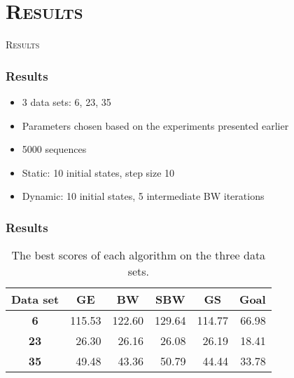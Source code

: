 \section{\scshape Results}

\begin{frame}
\center \huge \scshape Results
\end{frame}

\begin{frame}
  \frametitle{Results}
  \begin{itemize}
  	\item 3 data sets: 6, 23, 35
  	\item Parameters chosen based on the experiments presented earlier
  	\item 5000 sequences
  	\item Static: 10 initial states, step size 10
  	\item Dynamic: 10 initial states, 5 intermediate BW iterations
  \end{itemize}
\end{frame}

\begin{frame}
  \frametitle{Results} 
  \begin{center}
	\begin{table}[h]
		\centering
		\begin{tabular}{|c|r|r|r|r|r|}
		\hline
		Data set    & \multicolumn{1}{c|}{\textbf{GE}} & \multicolumn{1}{c|}{\textbf{BW}} & \multicolumn{1}{c|}{\textbf{SBW}} & \multicolumn{1}{c|}{\textbf{GS}} & \multicolumn{1}{c|}{\textbf{Goal}} \\ \hline
\textbf{6}  & 115.53                           & 122.60                           & 129.64                            & 114.77                           & 66.98                              		\\ \hline
		\textbf{23} & 26.30                            & 26.16                            & 26.08                             & 26.19                            & 18.41                              		\\ \hline
		\textbf{35} & 49.48                            & 43.36                            & 50.79                             & 44.44                            & 33.78                              		\\ \hline
		\end{tabular}
	\caption{The best scores of each algorithm on the three data sets.}
	\label{table:pautomac-best-score}
	\end{table}
  \end{center}
\end{frame}
	

